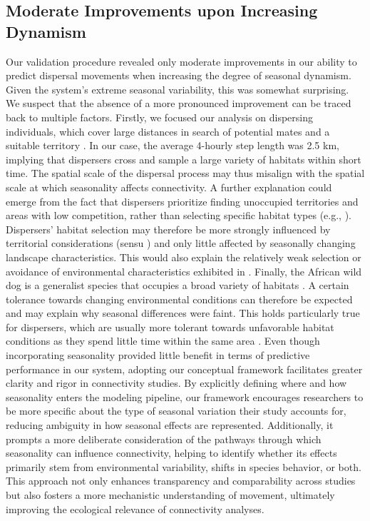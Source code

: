 \documentclass[abstract=on,10pt,a4paper,bibliography=totocnumbered]{article}
\begin{document}
\subsection{Moderate Improvements upon Increasing Dynamism}

Our validation procedure revealed only moderate improvements in our ability to
predict dispersal movements when increasing the degree of seasonal dynamism.
Given the system's extreme seasonal variability, this was somewhat surprising.
We suspect that the absence of a more pronounced improvement can be traced back
to multiple factors. Firstly, we focused our analysis on dispersing individuals,
which cover large distances in search of potential mates and a suitable
territory \citep{McNutt.1996, Cozzi.2020}. In our case, the average 4-hourly
step length was 2.5 km, implying that dispersers cross and sample a large
variety of habitats within short time. The spatial scale of the dispersal
process may thus misalign with the spatial scale at which seasonality affects
connectivity. A further explanation could emerge from the fact that dispersers
prioritize finding unoccupied territories and areas with low competition, rather
than selecting specific habitat types (e.g., \citealp{Creel.1996, Creel.2001}).
Dispersers' habitat selection may therefore be more strongly influenced by
territorial considerations (sensu \citealp{Cozzi.2018}) and only little affected
by seasonally changing landscape characteristics. This would also explain the
relatively weak selection or avoidance of environmental characteristics
exhibited in . Finally, the African wild dog is a
generalist species that occupies a broad variety of habitats
\citep{Woodroffe.2011}. A certain tolerance towards changing environmental
conditions can therefore be expected and may explain why seasonal differences
were faint. This holds particularly true for dispersers, which are usually more
tolerant towards unfavorable habitat conditions as they spend little time within
the same area \citep{Elliot.2014, ONeill.2020}. Even though incorporating
seasonality provided little benefit in terms of predictive performance in our
system, adopting our conceptual framework facilitates greater clarity and rigor
in connectivity studies. By explicitly defining where and how seasonality enters
the modeling pipeline, our framework encourages researchers to be more specific
about the type of seasonal variation their study accounts for, reducing
ambiguity in how seasonal effects are represented. Additionally, it prompts a
more deliberate consideration of the pathways through which seasonality can
influence connectivity, helping to identify whether its effects primarily stem
from environmental variability, shifts in species behavior, or both. This
approach not only enhances transparency and comparability across studies but
also fosters a more mechanistic understanding of movement, ultimately improving
the ecological relevance of connectivity analyses.
\end{document}
